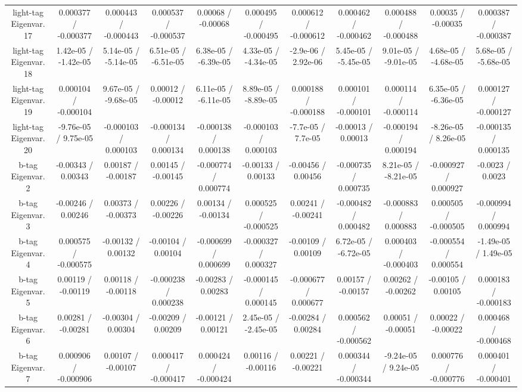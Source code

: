 \begin{table}[htbp]
\begin{center}
\begin{tabular}{|c|c|c|c|c|c|c|c|c|c|c|}
  light-tag Eigenvar. 17 & 0.000377 / -0.000377 & 0.000443 / -0.000443 & 0.000537 / -0.000537 & 0.00068 / -0.00068 & 0.000495 / -0.000495 & 0.000612 / -0.000612 & 0.000462 / -0.000462 & 0.000488 / -0.000488 & 0.00035 / -0.00035 & 0.000387 / -0.000387 \\ 
  light-tag Eigenvar. 18 & 1.42e-05 / -1.42e-05 & 5.14e-05 / -5.14e-05 & 6.51e-05 / -6.51e-05 & 6.38e-05 / -6.39e-05 & 4.33e-05 / -4.34e-05 & -2.9e-06 / 2.92e-06 & 5.45e-05 / -5.45e-05 & 9.01e-05 / -9.01e-05 & 4.68e-05 / -4.68e-05 & 5.68e-05 / -5.68e-05 \\ 
  light-tag Eigenvar. 19 & 0.000104 / -0.000104 & 9.67e-05 / -9.68e-05 & 0.00012 / -0.00012 & 6.11e-05 / -6.11e-05 & 8.89e-05 / -8.89e-05 & 0.000188 / -0.000188 & 0.000101 / -0.000101 & 0.000114 / -0.000114 & 6.35e-05 / -6.36e-05 & 0.000127 / -0.000127 \\ 
  light-tag Eigenvar. 20 & -9.76e-05 / 9.75e-05 & -0.000103 / 0.000103 & -0.000134 / 0.000134 & -0.000138 / 0.000138 & -0.000103 / 0.000103 & -7.7e-05 / 7.7e-05 & -0.00013 / 0.00013 & -0.000194 / 0.000194 & -8.26e-05 / 8.26e-05 & -0.000135 / 0.000135 \\ 
  b-tag Eigenvar. 2 & -0.00343 / 0.00343 & 0.00187 / -0.00187 & 0.00145 / -0.00145 & -0.000774 / 0.000774 & -0.00133 / 0.00133 & -0.00456 / 0.00456 & -0.000735 / 0.000735 & 8.21e-05 / -8.21e-05 & -0.000927 / 0.000927 & -0.0023 / 0.0023 \\ 
  b-tag Eigenvar. 3 & -0.00246 / 0.00246 & 0.00373 / -0.00373 & 0.00226 / -0.00226 & 0.00134 / -0.00134 & 0.000525 / -0.000525 & 0.00241 / -0.00241 & -0.000482 / 0.000482 & -0.000883 / 0.000883 & 0.000505 / -0.000505 & -0.000994 / 0.000994 \\ 
  b-tag Eigenvar. 4 & 0.000575 / -0.000575 & -0.00132 / 0.00132 & -0.00104 / 0.00104 & -0.000699 / 0.000699 & -0.000327 / 0.000327 & -0.00109 / 0.00109 & 6.72e-05 / -6.72e-05 & 0.000403 / -0.000403 & -0.000554 / 0.000554 & -1.49e-05 / 1.49e-05 \\ 
  b-tag Eigenvar. 5 & 0.00119 / -0.00119 & 0.00118 / -0.00118 & -0.000238 / 0.000238 & -0.00283 / 0.00283 & -0.000145 / 0.000145 & -0.000677 / 0.000677 & 0.00157 / -0.00157 & 0.00262 / -0.00262 & -0.00105 / 0.00105 & 0.000183 / -0.000183 \\ 
  b-tag Eigenvar. 6 & 0.00281 / -0.00281 & -0.00304 / 0.00304 & -0.00209 / 0.00209 & -0.00121 / 0.00121 & 2.45e-05 / -2.45e-05 & -0.00284 / 0.00284 & 0.000562 / -0.000562 & 0.00051 / -0.00051 & 0.00022 / -0.00022 & 0.000468 / -0.000468 \\ 
  b-tag Eigenvar. 7 & 0.000906 / -0.000906 & 0.00107 / -0.00107 & 0.000417 / -0.000417 & 0.000424 / -0.000424 & 0.00116 / -0.00116 & 0.00221 / -0.00221 & 0.000344 / -0.000344 & -9.24e-05 / 9.24e-05 & 0.000776 / -0.000776 & 0.000401 / -0.000401 \\ 

\end{tabular}
\end{center}
\end{table}
